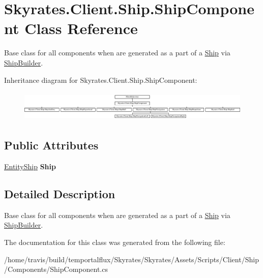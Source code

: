\hypertarget{class_skyrates_1_1_client_1_1_ship_1_1_ship_component}{\section{Skyrates.\-Client.\-Ship.\-Ship\-Component Class Reference}
\label{class_skyrates_1_1_client_1_1_ship_1_1_ship_component}
}


Base class for all components when are generated as a part of a \hyperlink{class_skyrates_1_1_client_1_1_ship_1_1_ship}{Ship} via \hyperlink{class_skyrates_1_1_client_1_1_ship_1_1_ship_builder}{Ship\-Builder}.  


Inheritance diagram for Skyrates.\-Client.\-Ship.\-Ship\-Component\-:\begin{figure}[H]
\begin{center}
\leavevmode
\includegraphics[height=1.487384cm]{class_skyrates_1_1_client_1_1_ship_1_1_ship_component}
\end{center}
\end{figure}
\subsection*{Public Attributes}
\begin{DoxyCompactItemize}
\item 
\hypertarget{class_skyrates_1_1_client_1_1_ship_1_1_ship_component_af4c14169c6e0cfbf19ddc9240dd95e74}{\hyperlink{class_skyrates_1_1_common_1_1_entity_1_1_entity_ship}{Entity\-Ship} {\bfseries Ship}}\label{class_skyrates_1_1_client_1_1_ship_1_1_ship_component_af4c14169c6e0cfbf19ddc9240dd95e74}

\end{DoxyCompactItemize}


\subsection{Detailed Description}
Base class for all components when are generated as a part of a \hyperlink{class_skyrates_1_1_client_1_1_ship_1_1_ship}{Ship} via \hyperlink{class_skyrates_1_1_client_1_1_ship_1_1_ship_builder}{Ship\-Builder}. 



The documentation for this class was generated from the following file\-:\begin{DoxyCompactItemize}
\item 
/home/travis/build/temportalflux/\-Skyrates/\-Skyrates/\-Assets/\-Scripts/\-Client/\-Ship/\-Components/Ship\-Component.\-cs\end{DoxyCompactItemize}
